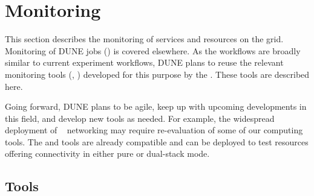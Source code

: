 \documentclass[../main-v1.tex]{subfiles}
\begin{document}
\chapter{Monitoring }
\label{ch:mon}

\FPadd\MonEtfTotalPeople\MonEtfOpsPeople\MonEtfDevPeople %

This section %
describes the monitoring of services and resources on the grid. %
Monitoring of DUNE jobs () is covered elsewhere.  As the workflows are broadly similar to current  experiment workflows, DUNE plans to reuse the relevant monitoring tools (, ) developed for this purpose by the . %
These tools are described here. 

Going forward, DUNE plans to be agile, keep up with upcoming developments in this field, and develop new tools as needed. For example, the widespread deployment of ~\cite{bib:ipv6TaskForce} networking may require re-evaluation of some of our computing tools.  The  and  tools are already  compatible and can be deployed to test resources offering  connectivity in either pure or dual-stack mode.

\section{Tools}
\label{sec:mon:xyz}  %
\end{document}
